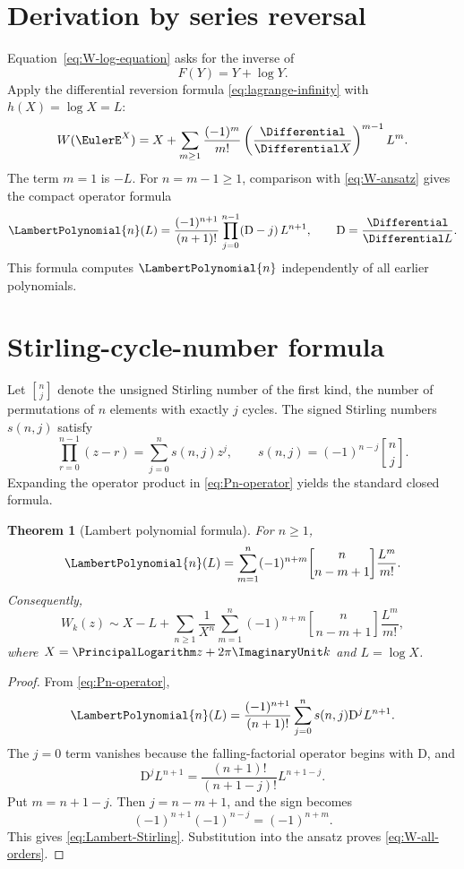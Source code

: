 \documentclass[11pt,openany]{book}
\theoremstyle{definition}
\theoremstyle{plain}
\newtheorem{theorem}{Theorem}[chapter]
\theoremstyle{remark}
\newcommand{\stirlingone}[2]{\genfrac{[}{]}{0pt}{}{#1}{#2}}
\newcommand{\Dop}{\mathrm{D}}
\begin{document}
\section{Derivation by series reversal}
Equation~\eqref{eq:W-log-equation} asks for the inverse of
\[
 F(Y)=Y+\log Y.
\]
Apply the differential reversion formula \cref{eq:lagrange-infinity} with
\(h(X)=\log X=L\):
\begin{equation}\label{eq:W-lagrange}
 W(\EulerE^X)
 =X+\sum_{m\ge1}\frac{(-1)^m}{m!}
 \left(\frac{\Differential}{\Differential X}\right)^{m-1}L^m.
\end{equation}
The term \(m=1\) is \(-L\).  For \(n=m-1\ge1\), comparison with
\cref{eq:W-ansatz} gives the compact operator formula
\begin{equation}\label{eq:Pn-operator}
 \LambertPolynomial{n}(L)=\frac{(-1)^{n+1}}{(n+1)!}
 \prod_{j=0}^{n-1}(\Dop-j)\,L^{n+1},
 \qquad \Dop=\frac{\Differential}{\Differential L}.
\end{equation}
This formula computes \(\LambertPolynomial{n}\) independently of all earlier polynomials.

\section{Stirling-cycle-number formula}
Let \(\stirlingone{n}{j}\) denote the unsigned Stirling number of the first kind,
the number of permutations of \(n\) elements with exactly \(j\) cycles.  The
signed Stirling numbers \(s(n,j)\) satisfy
\[
 \prod_{r=0}^{n-1}(z-r)=\sum_{j=0}^ns(n,j)z^j,
 \qquad
 s(n,j)=(-1)^{n-j}\stirlingone{n}{j}.
\]
Expanding the operator product in \cref{eq:Pn-operator} yields the standard
closed formula.

\begin{theorem}[Lambert polynomial formula]\label{thm:Lambert-Stirling}
For \(n\ge1\),
\begin{equation}\label{eq:Lambert-Stirling}
 \LambertPolynomial{n}(L)=
 \sum_{m=1}^{n}(-1)^{n+m}
 \stirlingone{n}{n-m+1}\frac{L^m}{m!}.
\end{equation}
Consequently,
\begin{equation}\label{eq:W-all-orders}
 W_k(z)\sim
 X-L+\sum_{n\ge1}\frac1{X^n}
 \sum_{m=1}^{n}(-1)^{n+m}
 \stirlingone{n}{n-m+1}\frac{L^m}{m!},
\end{equation}
where \(X=\PrincipalLogarithm z+2\pi\ImaginaryUnit k\) and \(L=\log X\).
\end{theorem}
\begin{proof}
From \cref{eq:Pn-operator},
\[
 \LambertPolynomial{n}(L)=\frac{(-1)^{n+1}}{(n+1)!}
 \sum_{j=0}^ns(n,j)\Dop^jL^{n+1}.
\]
The \(j=0\) term vanishes because the falling-factorial operator begins with
\(\Dop\), and
\[
 \Dop^jL^{n+1}=\frac{(n+1)!}{(n+1-j)!}L^{n+1-j}.
\]
Put \(m=n+1-j\).  Then \(j=n-m+1\), and the sign becomes
\[
 (-1)^{n+1}(-1)^{n-j}=(-1)^{n+m}.
\]
This gives \cref{eq:Lambert-Stirling}.  Substitution into the ansatz proves
\cref{eq:W-all-orders}.
\end{proof}
\end{document}
